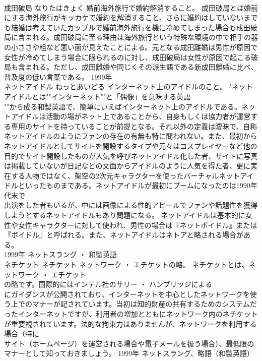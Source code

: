 \documentclass[8pt]{extreport}
\begin{document}
\begin{CJK}{UTF8}{min}
\\	成田破局	なりたはきょく	婚前海外旅行で婚約解消すること。	成田破局とは婚前にする海外旅行がキッカケで婚約を解消すること、さらに婚約はしていないまでも結婚は考えていたカップルで婚前海外旅行を機に冷めてしまった場合も成田破局に含まれる。成田破局に至る理由は海外旅行という特殊な環境の中で相手の器の小ささや粗など悪い面が見えたことによる。元となる成田離婚は男性が原因で女性が冷めてしまう場合に限られるのに対し、成田破局は女性が原因で起こる破局も含まれる。ただし、成田離婚や同じくその派生語である新成田離婚に比べ、普及度の低い言葉である。	1999年	
\\	ネットアイドル	ねっとあいどる	インターネット上のアイドルのこと。	"ネットアイドルとは""インターネット""と「偶像」を意味する英語
\\	""から成る和製英語で、簡単にいえばインターネット上のアイドルである。ネットアイドルは活動の場がネット上であることから、自身もしくは協力者が運営する専用のサイトを持っていることが前提となる。それ以外の定義は曖昧で、自称ネットアイドルのようにファンの存在の有無も特に問われない。また、最初からネットアイドルとしてサイトを開設するタイプや元々はコスプレイヤーなど他の目的でサイト開設したものが人気を呼びネットアイドル化した者、サイトに写真は掲載していないが日記などの文面からアイドルのように人気を得た者、更に実在する人物ではなく、架空の2次元キャラクターを使ったバーチャルネットアイドルといったものまである。ネットアイドルが最初にブームになったのは1990年代末で
\\	出演をした者もいるが、中には画像による性的アピールでファンや話題性を獲得しようとするネットアイドルもあり問題になる。 ネットアイドルは基本的に女性や女性キャラクターに対して使われ、男性の場合は『ネットボイドル』または『ボイドル』と呼ばれる。また、ネットアイドルはネトアと略される場合がある。
\\	1999年	ネットスラング ・ 和製英語	
\\	ネチケット	ネチケット	ネットワーク ・ エチケットの略。	ネチケットとは、ネットワーク ・ エチケット
\\	の略です。国際的にはインテル社のサリー ・ ハンブリッジによる
\\	にガイダンスが公開されており、インターネットを中心としたネットワークを使う上でのマナーが記されています。当初は知的財産の共有するためのシステムだったインターネットですが、利用者の増加とともにネットワーク内のネチケットが重要視されています。法的な拘束力はありませんが、ネットワークを利用する場合（特に
\\	サイト（ホームページ）を運営される場合や電子メールを扱う場合）、最低限のマナーとして知っておきましょう。	1999年	ネットスラング、略語（和製英語）	

\end{CJK}
\end{document}
